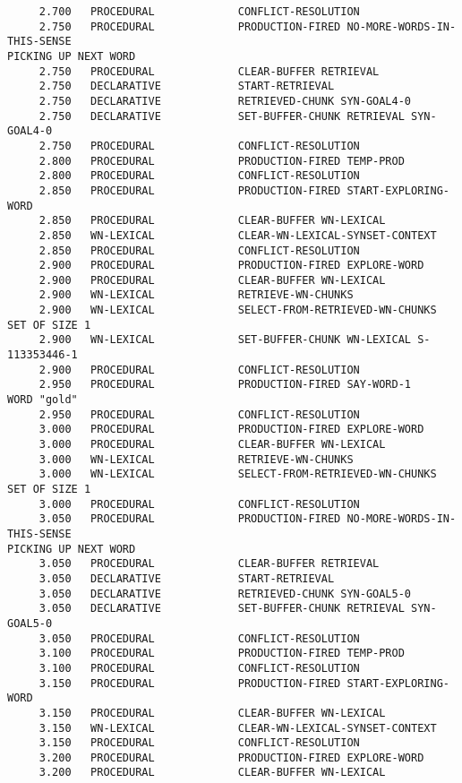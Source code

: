 \begin{verbatim}
     2.700   PROCEDURAL             CONFLICT-RESOLUTION 
     2.750   PROCEDURAL             PRODUCTION-FIRED NO-MORE-WORDS-IN-THIS-SENSE 
PICKING UP NEXT WORD 
     2.750   PROCEDURAL             CLEAR-BUFFER RETRIEVAL 
     2.750   DECLARATIVE            START-RETRIEVAL 
     2.750   DECLARATIVE            RETRIEVED-CHUNK SYN-GOAL4-0 
     2.750   DECLARATIVE            SET-BUFFER-CHUNK RETRIEVAL SYN-GOAL4-0 
     2.750   PROCEDURAL             CONFLICT-RESOLUTION 
     2.800   PROCEDURAL             PRODUCTION-FIRED TEMP-PROD 
     2.800   PROCEDURAL             CONFLICT-RESOLUTION 
     2.850   PROCEDURAL             PRODUCTION-FIRED START-EXPLORING-WORD 
     2.850   PROCEDURAL             CLEAR-BUFFER WN-LEXICAL 
     2.850   WN-LEXICAL             CLEAR-WN-LEXICAL-SYNSET-CONTEXT 
     2.850   PROCEDURAL             CONFLICT-RESOLUTION 
     2.900   PROCEDURAL             PRODUCTION-FIRED EXPLORE-WORD 
     2.900   PROCEDURAL             CLEAR-BUFFER WN-LEXICAL 
     2.900   WN-LEXICAL             RETRIEVE-WN-CHUNKS 
     2.900   WN-LEXICAL             SELECT-FROM-RETRIEVED-WN-CHUNKS SET OF SIZE 1 
     2.900   WN-LEXICAL             SET-BUFFER-CHUNK WN-LEXICAL S-113353446-1 
     2.900   PROCEDURAL             CONFLICT-RESOLUTION 
     2.950   PROCEDURAL             PRODUCTION-FIRED SAY-WORD-1 
WORD "gold" 
     2.950   PROCEDURAL             CONFLICT-RESOLUTION 
     3.000   PROCEDURAL             PRODUCTION-FIRED EXPLORE-WORD 
     3.000   PROCEDURAL             CLEAR-BUFFER WN-LEXICAL 
     3.000   WN-LEXICAL             RETRIEVE-WN-CHUNKS 
     3.000   WN-LEXICAL             SELECT-FROM-RETRIEVED-WN-CHUNKS SET OF SIZE 1 
     3.000   PROCEDURAL             CONFLICT-RESOLUTION 
     3.050   PROCEDURAL             PRODUCTION-FIRED NO-MORE-WORDS-IN-THIS-SENSE 
PICKING UP NEXT WORD 
     3.050   PROCEDURAL             CLEAR-BUFFER RETRIEVAL 
     3.050   DECLARATIVE            START-RETRIEVAL 
     3.050   DECLARATIVE            RETRIEVED-CHUNK SYN-GOAL5-0 
     3.050   DECLARATIVE            SET-BUFFER-CHUNK RETRIEVAL SYN-GOAL5-0 
     3.050   PROCEDURAL             CONFLICT-RESOLUTION 
     3.100   PROCEDURAL             PRODUCTION-FIRED TEMP-PROD 
     3.100   PROCEDURAL             CONFLICT-RESOLUTION 
     3.150   PROCEDURAL             PRODUCTION-FIRED START-EXPLORING-WORD 
     3.150   PROCEDURAL             CLEAR-BUFFER WN-LEXICAL 
     3.150   WN-LEXICAL             CLEAR-WN-LEXICAL-SYNSET-CONTEXT 
     3.150   PROCEDURAL             CONFLICT-RESOLUTION 
     3.200   PROCEDURAL             PRODUCTION-FIRED EXPLORE-WORD 
     3.200   PROCEDURAL             CLEAR-BUFFER WN-LEXICAL 

\end{verbatim}
